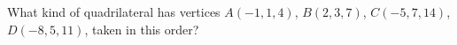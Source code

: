 What kind of quadrilateral has vertices $A(-1,1,4)$, $B(2,3,7)$, $C(-5,7,14)$, $D(-8,5,11)$, taken in this order?
